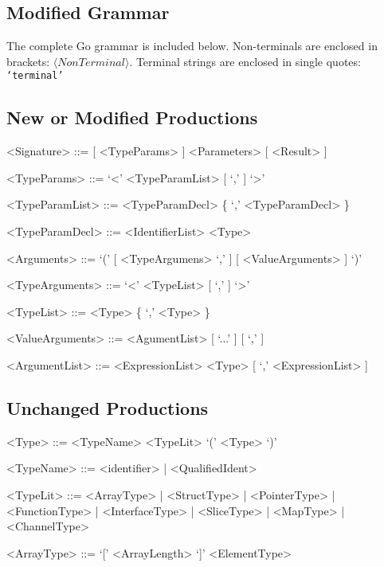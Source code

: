 \documentclass[letterpaper,11pt]{article}
\begin{document}
\begin{appendices}

\section{Modified Grammar} \label{App:grammar}

The complete Go grammar is included below. Non-terminals are enclosed in brackets: $\langle NonTerminal \rangle$. Terminal strings are enclosed in single quotes: \texttt{`terminal'}

\subsection{New or Modified Productions}

\begin{grammar}

<Signature> ::= [ <TypeParams> ] <Parameters> [ <Result> ]

<TypeParams> ::= `<' <TypeParamList> [ `,' ] `>'

<TypeParamList> ::= <TypeParamDecl> \{ `,' <TypeParamDecl> \}

<TypeParamDecl> ::= <IdentifierList> <Type>

<Arguments>      ::= `(' [ <TypeArgumens> `,' ] [ <ValueArguments> ] `)'

<TypeArguments> ::= `<' <TypeList> [ `,' ] `>'

<TypeList>        ::= <Type> \{ `,' <Type> \}

<ValueArguments> ::= <AgumentList> [ `...' ] [ `,' ]

<ArgumentList> ::= <ExpressionList>
\alt <Type> [ `,' <ExpressionList> ]

\end{grammar}

\subsection{Unchanged Productions}

\begin{grammar}

<Type>      ::= <TypeName>
\alt <TypeLit>
\alt `(' <Type> `)'

<TypeName>  ::= <identifier> | <QualifiedIdent>

<TypeLit>   ::= <ArrayType> | <StructType> | <PointerType> | <FunctionType> 
| <InterfaceType> | <SliceType> | <MapType> | <ChannelType>


<ArrayType>   ::= `[' <ArrayLength> `]' <ElementType>


\end{grammar}
\end{appendices}
\end{document}
